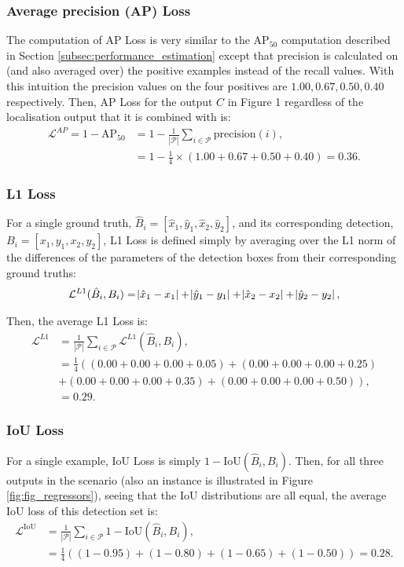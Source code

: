\documentclass{article}
\begin{document}
\subsubsection{Average precision (AP) Loss}
The computation of AP Loss is very similar to the $\mathrm{AP}_{\mathrm{50}}$ computation described in Section \ref{subsec:performance_estimation} except that precision is calculated on (and also averaged over) the positive examples instead of the recall values. With this intuition the precision values on the four positives are $1.00, 0.67, 0.50, 0.40$ respectively. Then, AP Loss for the output $C$ in Figure 1 regardless of the localisation output that it is combined with is:
\begin{align*}
    \mathcal{L}^{AP} = 1- \mathrm{\mathrm{AP}}_{50} &= 1 - \frac{1}{|\mathcal{P}|} \sum \limits_{i \in \mathcal{P}} \mathrm{precision}(i), \\
    &= 1 - \frac{1}{4}\times \left( 1.00+0.67+0.50+0.40 \right) = 0.36.
\end{align*}

\subsubsection{L1 Loss}
For a single ground truth, $\hat{B}_i=[\hat{x}_1, \hat{y}_1, \hat{x}_2, \hat{y}_2]$, and its corresponding detection, $B_i=[x_1, y_1, x_2, y_2]$, L1 Loss is defined simply by averaging over the L1 norm of the differences of the parameters of the detection boxes from their corresponding ground truths:
\begin{align}
    \label{eq:L1Loss}
    \mathcal{L}^{L1} (\hat{B}_i, B_i) =  \abs{\hat{x}_1-x_1}+\abs{\hat{y}_1-y_1}+\abs{\hat{x}_2-x_2}+\abs{\hat{y}_2-y_2},
\end{align}

Then, the average L1 Loss is:
\begin{align}
    \mathcal{L}^{L1} &=\frac{1}{|\mathcal{P}|} \sum_{i \in \mathcal{P}} \mathcal{L}^{L1} (\hat{B}_i, B_i), \\
    &=\frac{1}{4}\left( (0.00+0.00+0.00+0.05)+(0.00+0.00+0.00+0.25) \right.\\
    &\left. +(0.00+0.00+0.00+0.35)+(0.00+0.00+0.00+0.50)\right),\\
    &=0.29.
\end{align}


\subsubsection{IoU Loss}
For a single example, IoU Loss is simply $1-\mathrm{IoU}(\hat{B}_i, B_i)$. Then, for all three outputs in the scenario (also an instance is illustrated in Figure \ref{fig:fig_regressors}), seeing that the IoU distributions are all equal, the average IoU loss of this detection set is:
\begin{align*}
\mathcal{L}^{\mathrm{IoU}} &= \frac{1}{|\mathcal{P}|}\sum \limits_{i \in \mathcal{P}} 1-\mathrm{IoU}(\hat{B}_i, B_i), \\
&= \frac{1}{4} \left( (1-0.95)+ (1-0.80) + (1-0.65) + (1-0.50) \right) = 0.28.
\end{align*}
\end{document}
